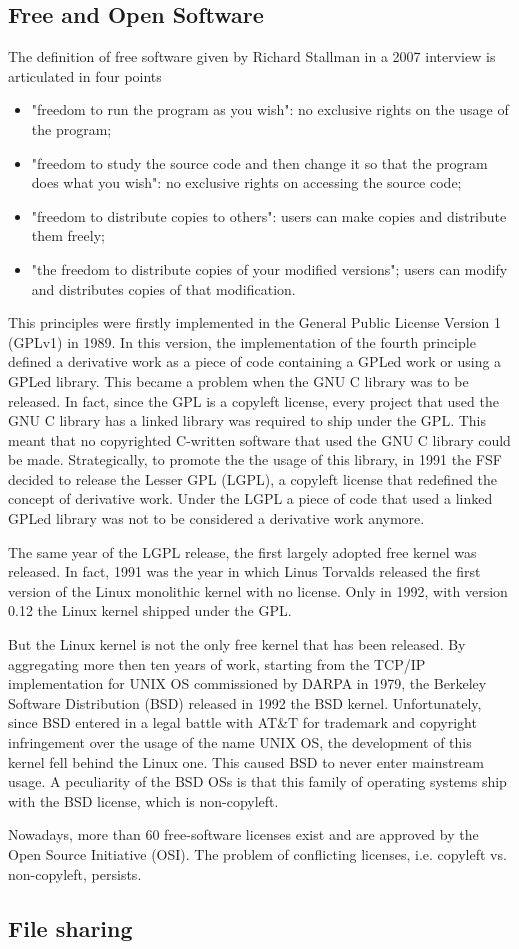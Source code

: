 \subsection*{Free and Open Software}

The definition of free software given by Richard Stallman in a 2007 interview is articulated in four points

\begin{itemize}
    \item "freedom to run the program as you wish": no exclusive rights on the usage of the program;
    \item "freedom to study the source code and then change it so that the program does what you wish": no exclusive rights on accessing the source code;
    \item "freedom to distribute copies to others": users can make copies and distribute them freely;
    \item "the freedom to distribute copies of your modified versions"; users can modify and distributes copies of that modification.
\end{itemize}

This principles were firstly implemented in the General Public License Version 1 (GPLv1) in 1989. In this version, the implementation of the fourth principle defined a derivative work as a piece of code containing a GPLed work or using a GPLed library. This became a problem when the GNU C library was to be released. In fact, since the GPL is a copyleft license, every project that used the GNU C library has a linked library was required to ship under the GPL. This meant that no copyrighted C-written software that used the GNU C library could be made.
Strategically, to promote the the usage of this library, in 1991 the FSF decided to release the Lesser GPL (LGPL), a copyleft license that redefined the concept of derivative work. Under the LGPL a piece of code that used a linked GPLed library was not to be considered a derivative work anymore.

The same year of the LGPL release, the first largely adopted free kernel was released. In fact, 1991 was the year in which Linus Torvalds released the first version of the Linux monolithic kernel with no license. Only in 1992, with version 0.12 the Linux kernel shipped under the GPL.

But the Linux kernel is not the only free kernel that has been released. By aggregating more then ten years of work, starting from the TCP/IP implementation for UNIX OS commissioned by DARPA in 1979, the Berkeley Software Distribution (BSD) released in 1992 the BSD kernel. Unfortunately, since BSD entered in a legal battle with AT\&T for trademark and copyright infringement over the usage of the name UNIX OS, the development of this kernel fell behind the Linux one. This caused BSD to never enter mainstream usage. A peculiarity of the BSD OSs is that this family of operating systems ship with the BSD license, which is non-copyleft.

Nowadays, more than 60 free-software licenses exist and are approved by the Open Source Initiative (OSI). The problem of conflicting licenses, i.e. copyleft vs. non-copyleft, persists.

\subsection*{File sharing}